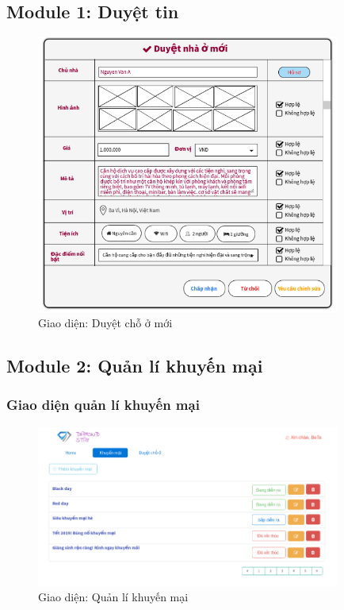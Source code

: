 \subsection{Module 1: Duyệt tin}
\begin{figure}[H]
	\centering
	\includegraphics[width=10cm]{Image/uiDuyettin.png}
	\vspace{0.5cm}
	\caption{Giao diện: Duyệt chỗ ở mới}
\end{figure}

\subsection{Module 2: Quản lí khuyến mại}
\subsubsection{Giao diện quản lí khuyến mại}
\begin{figure}[H]
	\centering
	\includegraphics[width=10cm]{Image/PromoManager.png}
	\vspace{0.5cm}
	\caption{Giao diện: Quản lí khuyến mại}
\end{figure}

